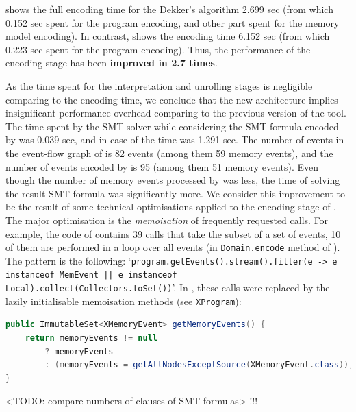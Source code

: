 \porthos[2] shows the full encoding time for the Dekker's algorithm 2.699 sec (from which 0.152 sec spent for the program encoding, and other part spent for the memory model encoding).
In contrast, \porthos[1] shows the encoding time 6.152 sec (from which 0.223 sec spent for the program encoding). %
Thus, the performance of the encoding stage has been\textbf{ improved in 2.7 times}.

As the time spent for the interpretation and unrolling stages is negligible comparing to the encoding time, we conclude that the new architecture implies insignificant performance overhead comparing to the previous version of the tool.
The time spent by the SMT solver while considering the SMT formula encoded by \porthos[2] was 0.039 sec, and in case of \porthos[1] the time was 1.291 sec.
The number of events in the event-flow graph of \porthos[2] is 82 events (among them 59 memory events), and the number of events encoded by \porthos[1] is 95 (among them 51 memory events).
Even though the number of memory events processed by \porthos[1] was less, the time of solving the result SMT-formula was significantly more.
We consider this improvement to be the result of some technical optimisations applied to the encoding stage of \porthos[2].
The major optimisation is the \textit{memoisation} of frequently requested calls.
For example, the code of \porthos[1] contains 39 calls that take the subset of a set of events, 10 of them are performed in a loop over all events (in \texttt{Domain.encode} method of \porthos[2]).
The pattern is the following: `\lstinline{program.getEvents().stream().filter(e -> e instanceof MemEvent || e instanceof Local).collect(Collectors.toSet())}'.
In \porthos[2], these calls were replaced by the lazily initialisable memoisation methods (see \texttt{XProgram}): \\

\vspace{-1em}
\begin{lstlisting}[language=Java]
public ImmutableSet<XMemoryEvent> getMemoryEvents() {
    return memoryEvents != null
        ? memoryEvents
        : (memoryEvents = getAllNodesExceptSource(XMemoryEvent.class));
}
\end{lstlisting}


<TODO: compare numbers of clauses of SMT formulas> !!!

